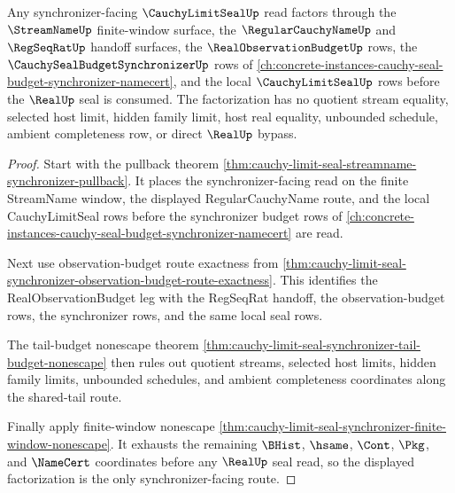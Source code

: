 \begin{theorem}
\label{thm:cauchy-limit-seal-synchronizer-route-factorization}
Any synchronizer-facing $\CauchyLimitSealUp$ read factors through the $\StreamNameUp$ finite-window surface, the $\RegularCauchyNameUp$ and $\RegSeqRatUp$ handoff surfaces, the $\RealObservationBudgetUp$ rows, the $\CauchySealBudgetSynchronizerUp$ rows of \autoref{ch:concrete-instances-cauchy-seal-budget-synchronizer-namecert}, and the local $\CauchyLimitSealUp$ rows before the $\RealUp$ seal is consumed. The factorization has no quotient stream equality, selected host limit, hidden family limit, host real equality, unbounded schedule, ambient completeness row, or direct $\RealUp$ bypass.
\end{theorem}
\begin{proof}
Start with the pullback theorem \autoref{thm:cauchy-limit-seal-streamname-synchronizer-pullback}. It places the synchronizer-facing read on the finite StreamName window, the displayed RegularCauchyName route, and the local CauchyLimitSeal rows before the synchronizer budget rows of \autoref{ch:concrete-instances-cauchy-seal-budget-synchronizer-namecert} are read.

Next use observation-budget route exactness from \autoref{thm:cauchy-limit-seal-synchronizer-observation-budget-route-exactness}. This identifies the RealObservationBudget leg with the RegSeqRat handoff, the observation-budget rows, the synchronizer rows, and the same local seal rows.

The tail-budget nonescape theorem \autoref{thm:cauchy-limit-seal-synchronizer-tail-budget-nonescape} then rules out quotient streams, selected host limits, hidden family limits, unbounded schedules, and ambient completeness coordinates along the shared-tail route.

Finally apply finite-window nonescape \autoref{thm:cauchy-limit-seal-synchronizer-finite-window-nonescape}. It exhausts the remaining $\BHist$, $\hsame$, $\Cont$, $\Pkg$, and $\NameCert$ coordinates before any $\RealUp$ seal read, so the displayed factorization is the only synchronizer-facing route.
\end{proof}

